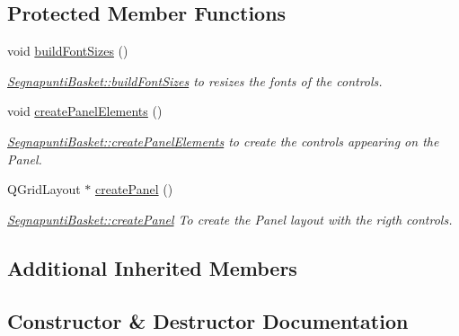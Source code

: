 \subsection*{Protected Member Functions}
\begin{DoxyCompactItemize}
\item 
\mbox{\label{classSegnapuntiBasket_aa2add908581400f65c1b976e444aebe4}} 
void \mbox{\hyperlink{classSegnapuntiBasket_aa2add908581400f65c1b976e444aebe4}{build\+Font\+Sizes}} ()
\begin{DoxyCompactList}\small\item\em \mbox{\hyperlink{classSegnapuntiBasket_aa2add908581400f65c1b976e444aebe4}{Segnapunti\+Basket\+::build\+Font\+Sizes}} to resizes the fonts of the controls. \end{DoxyCompactList}\item 
\mbox{\label{classSegnapuntiBasket_aac38a90c34194fca1d97eb3065c2c9cb}} 
void \mbox{\hyperlink{classSegnapuntiBasket_aac38a90c34194fca1d97eb3065c2c9cb}{create\+Panel\+Elements}} ()
\begin{DoxyCompactList}\small\item\em \mbox{\hyperlink{classSegnapuntiBasket_aac38a90c34194fca1d97eb3065c2c9cb}{Segnapunti\+Basket\+::create\+Panel\+Elements}} to create the controls appearing on the Panel. \end{DoxyCompactList}\item 
Q\+Grid\+Layout $\ast$ \mbox{\hyperlink{classSegnapuntiBasket_a4fd8f038194cbb70dd732babc6ab3dfa}{create\+Panel}} ()
\begin{DoxyCompactList}\small\item\em \mbox{\hyperlink{classSegnapuntiBasket_a4fd8f038194cbb70dd732babc6ab3dfa}{Segnapunti\+Basket\+::create\+Panel}} To create the Panel layout with the rigth controls. \end{DoxyCompactList}\end{DoxyCompactItemize}
\subsection*{Additional Inherited Members}


\subsection{Constructor \& Destructor Documentation}
\mbox{\label{classSegnapuntiBasket_aeaee10f4af8caa073e2b7016999d7c45}} 
